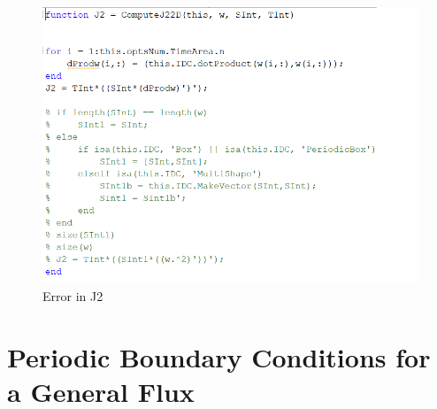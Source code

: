\documentclass[11pt, a4paper]{article}
\theoremstyle{definition}
\begin{document}
	\begin{figure}[h]
		\centering
		\includegraphics[scale=0.7]{error.png}
		\caption{Error in J2} 
		\label{F3}
	\end{figure}
	
	
	\section{Periodic Boundary Conditions for a General Flux}
\end{document}
